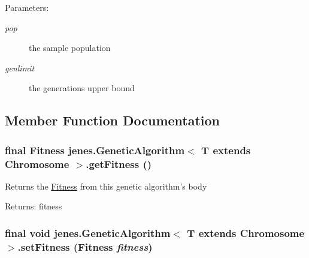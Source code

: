 \begin{Desc}
\item[Parameters:]
\begin{description}
\item[{\em pop}]the sample population \item[{\em genlimit}]the generations upper bound \end{description}
\end{Desc}


\subsection{Member Function Documentation}
\hypertarget{classjenes_1_1_genetic_algorithm_3_01_t_01extends_01_chromosome_01_4_687996ee45582145be24e2086fc8c210}{
\subsubsection[getFitness]{\setlength{\rightskip}{0pt plus 5cm}final Fitness jenes.GeneticAlgorithm$<$ T extends Chromosome $>$.getFitness ()}}
\label{classjenes_1_1_genetic_algorithm_3_01_t_01extends_01_chromosome_01_4_687996ee45582145be24e2086fc8c210}


Returns the \hyperlink{}{Fitness} from this genetic algorithm's body 

\begin{Desc}
\item[Returns:]fitness \end{Desc}
\hypertarget{classjenes_1_1_genetic_algorithm_3_01_t_01extends_01_chromosome_01_4_ff762153c3f11a2ad83936867ca31617}{
\subsubsection[setFitness]{\setlength{\rightskip}{0pt plus 5cm}final void jenes.GeneticAlgorithm$<$ T extends Chromosome $>$.setFitness (Fitness {\em fitness})}}
\label{classjenes_1_1_genetic_algorithm_3_01_t_01extends_01_chromosome_01_4_ff762153c3f11a2ad83936867ca31617}


